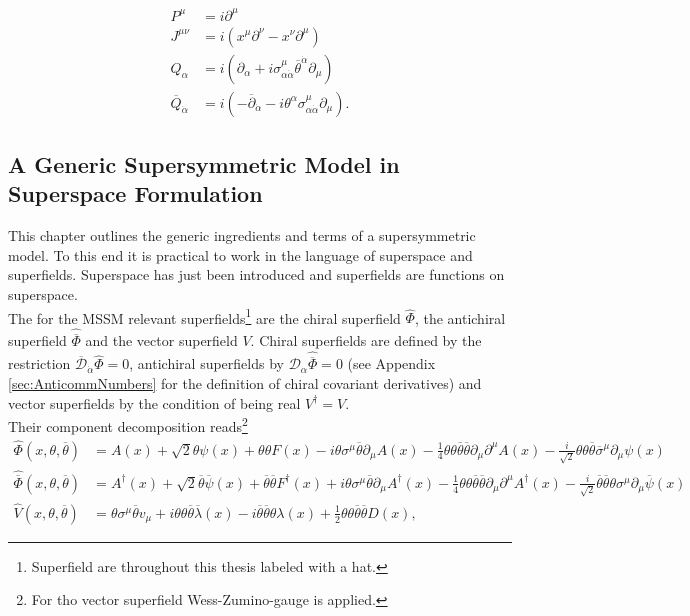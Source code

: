 \begin{align}
P^\mu &= i\partial^\mu\nonumber\\
J^{\mu\nu} &= i(x^\mu\partial^\nu - x^\nu\partial^\mu)\nonumber\\
Q_\alpha &= i(\partial_\alpha + i\sigma^\mu_{\alpha\dot{\alpha}}
\overline{\theta}^{\dot{\alpha}}\partial_\mu)\nonumber\\
\overline{Q}_{\dot{\alpha}} &= i(-\overline{\partial}_{\dot{\alpha}} - i \theta^\alpha \sigma^\mu_{\alpha\dot{\alpha}}\partial_\mu).\label{eq:SUSYGen}
\end{align}



\subsection{A Generic Supersymmetric Model in Superspace Formulation}
This chapter outlines the generic ingredients and terms of a supersymmetric model. To this end it is practical to work in the language of superspace and superfields. Superspace has just been introduced and superfields are functions on superspace.\\
The for the MSSM relevant superfields\footnote{Superfield are throughout this thesis labeled with a hat.} are the chiral superfield $\hat{\Phi}$, the antichiral superfield $\hat{\overline{\Phi}}$ and the vector superfield $V$. Chiral superfields are defined by the restriction $\overline{\mathcal{D}}_{\dot{\alpha}}\hat{\Phi} = 0$, antichiral superfields by $\mathcal{D}_\alpha\hat{\overline{\Phi}} = 0$ (see Appendix \ref{sec:AnticommNumbers} for the definition of chiral covariant derivatives) and vector superfields by the condition of being real $V^\dagger = V$.\\
Their component decomposition reads\footnote{For tho vector superfield Wess-Zumino-gauge is applied.}
\begin{align}
\hat{\Phi}(x,\theta,\overline{\theta}) &= A(x) + \sqrt{2}\theta\psi(x) + \theta\theta F(x) - i\theta\sigma^\mu \overline{\theta}\partial_\mu A(x) - \frac{1}{4}\theta\theta\overline{\theta}\overline{\theta}\partial_\mu\partial^\mu A(x) - \frac{i}{\sqrt{2}}\theta\theta\overline{\theta}\overline{\sigma}^\mu \partial_\mu\psi(x)\nonumber\\
\hat{\overline{\Phi}}(x,\theta,\overline{\theta}) &= A^\dagger(x) + \sqrt{2}\overline{\theta}\overline{\psi}(x) + \overline{\theta}\overline{\theta} F^\dagger(x) + i\theta\sigma^\mu \overline{\theta}\partial_\mu A^\dagger(x) - \frac{1}{4}\theta\theta\overline{\theta}\overline{\theta}\partial_\mu\partial^\mu A^\dagger(x) - \frac{i}{\sqrt{2}}\overline{\theta}\overline{\theta}\theta\sigma^\mu \partial_\mu\overline{\psi}(x)\nonumber\\
\hat{V}(x,\theta,\overline{\theta}) &= \theta\sigma^\mu\overline{\theta} v_\mu + i\theta\theta\overline{\theta}\overline{\lambda}(x) -i \overline{\theta}\overline{\theta}\theta\lambda(x) + \frac{1}{2}\theta\theta\overline{\theta}\overline{\theta}D(x),\label{eq:superfielddecomp}
\end{align}
